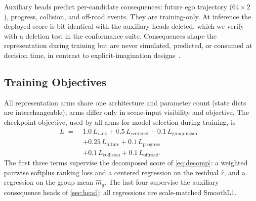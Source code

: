 Auxiliary heads predict per-candidate consequences: future ego trajectory ($64\times2$), progress, collision, and off-road events.
They are training-only.
At inference the deployed score is bit-identical with the auxiliary heads deleted, which we verify with a deletion test in the conformance suite.
Consequences shape the representation during training but are never simulated, predicted, or consumed at decision time, in contrast to explicit-imagination designs~\cite{li2025wote}.

\subsection{Training Objectives}
\label{sec:objectives}

All representation arms share one architecture and parameter count (state dicts are interchangeable); arms differ only in scene-input visibility and objective.
The checkpoint objective, used by all arms for model selection during training, is
\begin{equation}
\begin{split}
  L \;=\; & 1.0\,L_{\text{rank}} + 0.5\,L_{\text{centered}} + 0.1\,L_{\text{group-mean}} \\
  & + 0.25\,L_{\text{future}} + 0.1\,L_{\text{progress}} \\
  & + 0.1\,L_{\text{collision}} + 0.1\,L_{\text{offroad}}.
\end{split}
\label{eq:objective}
\end{equation}
The first three terms supervise the decomposed score of \cref{eq:decomp}: a weighted pairwise softplus ranking loss and a centered regression on the residual $\hat r$, and a regression on the group mean $\hat m_g$.
The last four supervise the auxiliary consequence heads of \cref{sec:head}; all regressions are scale-matched SmoothL1.

